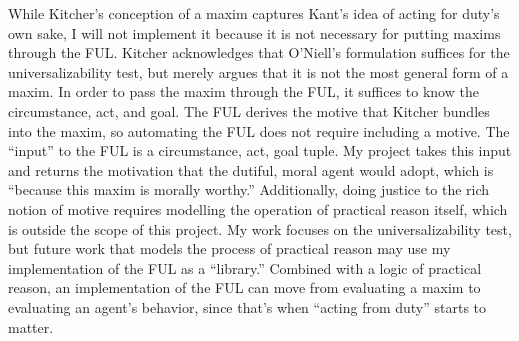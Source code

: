 \begin{isabellebody}
\begin{isamarkuptext}
While Kitcher's conception of a maxim captures Kant's idea of acting for duty's own sake, I will not implement it 
because it is not necessary for putting maxims through the FUL. Kitcher acknowledges that 
O'Niell's formulation suffices for the universalizability test, but merely argues that it is not the most general form of a maxim.
In order to pass the maxim through the FUL, it suffices to know the circumstance, act, and goal. The FUL
derives the motive that Kitcher bundles into the maxim, so automating the FUL does not require 
including a motive. The ``input'' to the FUL is a circumstance, act, goal tuple. My project takes 
this input and returns the motivation that the dutiful, moral agent would adopt, which is ``because this
maxim is morally worthy.'' Additionally, doing
justice to the rich notion of motive requires modelling the operation of practical reason itself, 
which is outside the scope of this project. My work focuses on the universalizability test, but future work that 
models the process of practical reason may use my implementation of the FUL as a ``library.'' Combined 
with a logic of practical reason, an implementation of the FUL can move from evaluating a maxim to 
evaluating an agent's behavior, since that's when ``acting from duty'' starts to matter.


\end{isamarkuptext}
\end{isabellebody}
